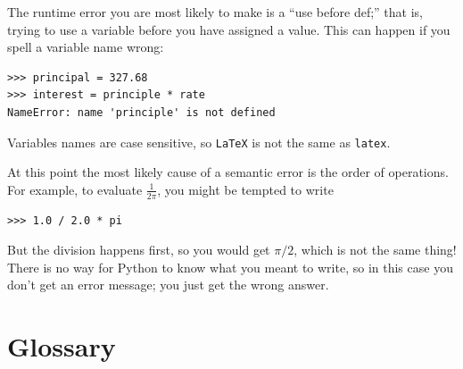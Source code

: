 \documentclass[10pt]{book}
\begin{document}

The runtime error you are most likely to make is a ``use before
def;'' that is, trying to use a variable before you have assigned
a value.  This can happen if you spell a variable name wrong:

\beforeverb
\begin{verbatim}
>>> principal = 327.68
>>> interest = principle * rate
NameError: name 'principle' is not defined
\end{verbatim}
\afterverb
%
Variables names are case sensitive, so {\tt LaTeX} is not the
same as {\tt latex}.


At this point the most likely cause of a semantic error is
the order of operations.  For example, to evaluate $\frac{1}{2 \pi}$,
you might be tempted to write

\beforeverb
\begin{verbatim}
>>> 1.0 / 2.0 * pi
\end{verbatim}
\afterverb
%
But the division happens first, so you would get $\pi / 2$, which
is not the same thing!  There is no way for Python
to know what you meant to write, so in this case you don't
get an error message; you just get the wrong answer.



\section{Glossary}
\end{document}
